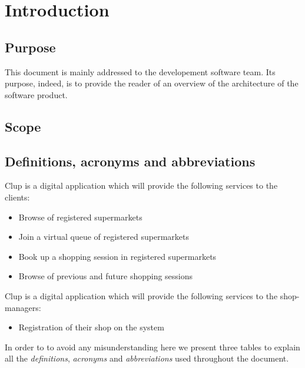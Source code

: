 \section{Introduction}
\label{sect:introduction}

\subsection{Purpose}
\label{subsect:purpose}
This document is mainly addressed to the developement software team. 
Its purpose, indeed, is to provide the reader of an overview of the architecture of the software product.

\subsection{Scope}
\label{subsect:scope}


\subsection{Definitions, acronyms and abbreviations}
\label{subsect:definitionsacronymsabbreviations}
Clup is a digital application which will provide the following services to the clients:
\begin{itemize}
    \item Browse of registered supermarkets
    \item Join a virtual queue of registered supermarkets 
    \item Book up a shopping session in registered supermarkets 
    \item Browse of previous and future shopping sessions 
\end{itemize}
Clup is a digital application which will provide the following services to the shop-managers:
\begin{itemize}
    \item Registration of their shop on the system
\end{itemize}

In order to to avoid any misunderstanding here we present three tables to explain all the \textit{definitions}, \textit{acronyms} and \textit{abbreviations} used throughout the document.

